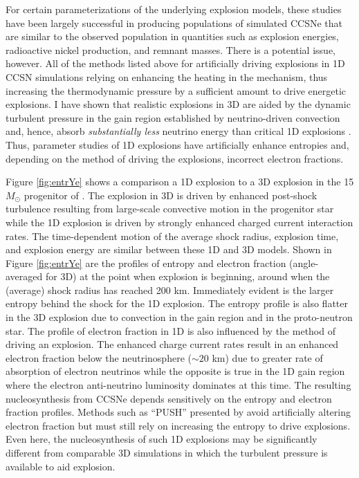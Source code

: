 For certain parameterizations of the underlying explosion models, these studies have been largely successful in producing populations of simulated CCSNe that are similar to the observed population in quantities such as explosion energies, radioactive nickel production, and remnant masses.
There is a potential issue, however.
All of the methods listed above for artificially driving explosions in 1D CCSN simulations relying on enhancing the heating in the mechanism, thus increasing the thermodynamic pressure by a sufficient amount to drive energetic explosions.
I have shown that realistic explosions in 3D are aided by the dynamic turbulent pressure in the gain region established by neutrino-driven convection and, hence, absorb {\it substantially less} neutrino energy than critical 1D explosions \citep{Couch:2015}.
Thus, parameter studies of 1D explosions have artificially enhance entropies and, depending on the method of driving the explosions, incorrect electron fractions.


Figure \ref{fig:entrYe} shows a comparison a 1D explosion to a 3D explosion in the 15 $M_\odot$ progenitor of \citet{Woosley:2007d}.
The explosion in 3D is driven by enhanced post-shock turbulence resulting from large-scale convective motion in the progenitor star \citep[from][]{Couch:2013b} while the 1D explosion is driven by strongly enhanced charged current interaction rates.
The time-dependent motion of the average shock radius, explosion time, and explosion energy are similar between these 1D and 3D models.
Shown in Figure \ref{fig:entrYe} are the profiles of entropy and electron fraction (angle-averaged for 3D) at the point when explosion is beginning, around when the (average) shock radius has reached 200 km.
Immediately evident is the larger entropy behind the shock for the 1D explosion.
The entropy profile is also flatter in the 3D explosion due to convection in the gain region and in the proto-neutron star.
The profile of electron fraction in 1D is also influenced by the method of driving an explosion.
The enhanced charge current rates result in an enhanced electron fraction below the neutrinosphere ($\sim20$ km) due to greater rate of absorption of electron neutrinos while the opposite is true in the 1D gain region where the electron anti-neutrino luminosity dominates at this time.
The resulting nucleosynthesis from CCSNe depends sensitively on the entropy and electron fraction profiles.
Methods such as ``PUSH'' presented by \citet{Perego:2015} avoid artificially altering electron fraction but must still rely on increasing the entropy to drive explosions.
Even here, the nucleosynthesis of such 1D explosions may be significantly different from comparable 3D simulations in which the turbulent pressure is available to aid explosion.


